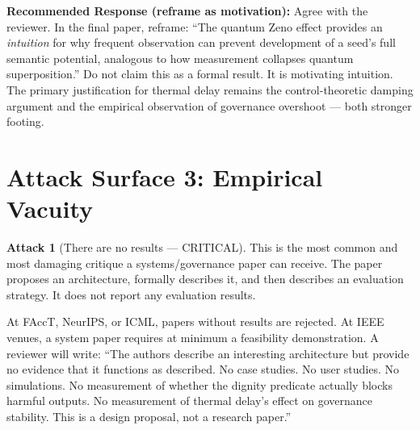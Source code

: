 \documentclass[12pt,a4paper]{article}
\theoremstyle{definition}
\newtheorem{attack}{Attack}[section]
\begin{document}
\begin{mdframed}[style=defenseframe]
\textbf{Recommended Response (reframe as motivation):}
Agree with the reviewer. In the final paper, reframe: ``The quantum Zeno effect
provides an \emph{intuition} for why frequent observation can prevent development
of a seed's full semantic potential, analogous to how measurement collapses quantum
superposition.'' Do not claim this as a formal result. It is motivating intuition.
The primary justification for thermal delay remains the control-theoretic damping
argument and the empirical observation of governance overshoot — both stronger
footing.
\end{mdframed}

\section{Attack Surface 3: Empirical Vacuity}

\begin{attack}[There are no results — CRITICAL]
\label{att:noresults}
This is the most common and most damaging critique a systems/governance paper can
receive. The paper proposes an architecture, formally describes it, and then
describes an evaluation strategy. It does not report any evaluation results.

At FAccT, NeurIPS, or ICML, papers without results are rejected. At IEEE venues,
a system paper requires at minimum a feasibility demonstration. A reviewer will
write: ``The authors describe an interesting architecture but provide no evidence
that it functions as described. No case studies. No user studies. No simulations.
No measurement of whether the dignity predicate actually blocks harmful outputs.
No measurement of thermal delay's effect on governance stability. This is a design
proposal, not a research paper.''
\end{attack}
\end{document}
